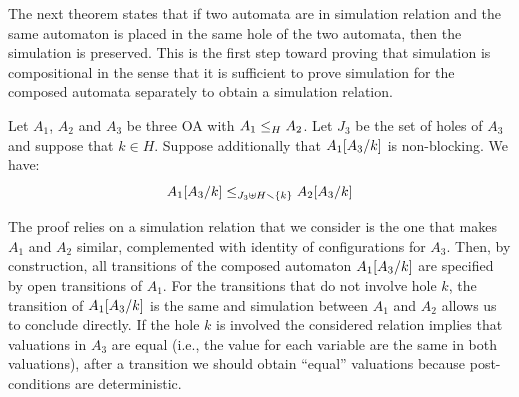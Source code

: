 \documentclass[runningheads]{llncs}
\begin{document}
The next  theorem states that if two automata are in simulation relation and the same automaton is placed in the same hole of the two automata, then the simulation is preserved. This is the first step toward proving that
 simulation is compositional in the sense that it is sufficient to prove simulation for the composed automata separately to obtain a simulation relation.
%
%



\begin{theorem}\label{thm:ContextRefinement}
Let $A_1$, $A_2$ and $A_3$ be three OA with $\wrel{A_1}{A_2}{H}$. 
Let $J_3$ be the set of holes of $A_3$ and suppose that $k \in H$.
Suppose additionally that  \(A_1\subst{A_3}{k}\) is non-blocking.
We have: \[\wrel{A_1\subst{A_3}{k}}{A_2\subst{A_3}{k}}{J_3 \uplus H \setminus \mbrc{k}}\]
\end{theorem}



%
%
%
%



\begin{proofsketch}
The proof relies on a simulation relation that we consider is the one that makes $A_1$ and $A_2$ similar, complemented with identity of configurations for $A_3$.
Then, by construction, all transitions of the composed automaton $A_1\subst{A_3}{k}$ are specified by open transitions of $A_1$. For the transitions that do not involve hole $k$, the transition of $A_1\subst{A_3}{k}$ is the same and simulation between $A_1$ and $A_2$ allows us to conclude directly. If the hole $k$ is involved the considered relation  implies that valuations in $A_3$ are equal (i.e., the value for each variable are the same in both valuations), after a transition we should obtain ``equal'' valuations because post-conditions are deterministic.
\end{proofsketch}
\end{document}

